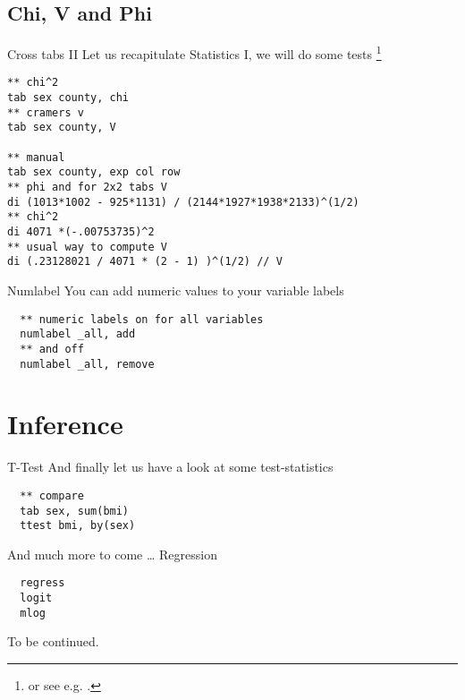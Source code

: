 \subsection{Chi, V and Phi}
\begin{frame}[fragile]{Cross tabs II}         
Let us recapitulate Statistics I, we will do some tests \footnote{or see e.g. \textcite{Agresti09}.}
\begin{lstlisting}
** chi^2
tab sex county, chi
** cramers v
tab sex county, V

** manual
tab sex county, exp col row
** phi and for 2x2 tabs V
di (1013*1002 - 925*1131) / (2144*1927*1938*2133)^(1/2) 
** chi^2
di 4071 *(-.00753735)^2
** usual way to compute V
di (.23128021 / 4071 * (2 - 1) )^(1/2) // V
\end{lstlisting}
\end{frame}

\begin{frame}[fragile]{Numlabel}
You can add numeric values to your variable labels 
\begin{lstlisting}
  ** numeric labels on for all variables
  numlabel _all, add
  ** and off
  numlabel _all, remove
\end{lstlisting}
\end{frame}

\section{Inference}
\begin{frame}[fragile]{T-Test}  
And finally let us have a look at some test-statistics
\begin{lstlisting}
  ** compare 
  tab sex, sum(bmi)
  ttest bmi, by(sex)
\end{lstlisting}
\end{frame}

\begin{frame}[fragile]{And much more to come \dots}   
Regression
\begin{lstlisting}
  regress
  logit
  mlog
\end{lstlisting}
\end{frame}

\begin{frame}
\thispagestyle{empty}
 To be continued.
\end{frame}
